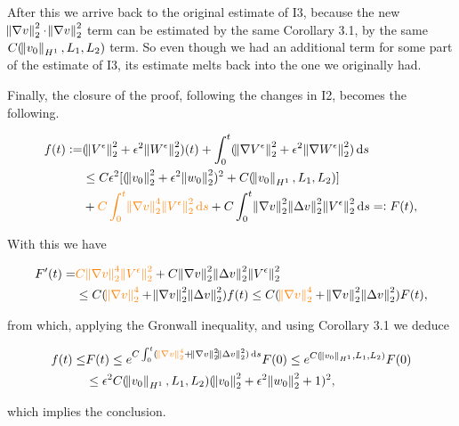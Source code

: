 \documentclass[11pt]{article}
\newcommand*\diff{\mathop{}\!\mathrm{d}}
\begin{document}
\begin{enumerate}
After this we arrive back to the original estimate of I3, because the new $\norm{\nabla v}_2^2 \cdot \norm{\nabla v}_2^2$ term can be estimated by the same Corollary 3.1, by the same $C(\norm{v_0}_{H^1}, L_1, L_2)$ term. So even though we had an additional term for some part of the estimate of I3, its estimate melts back into the one we originally had.

Finally, the closure of the proof, following the changes in I2, becomes the following.

\begin{equation}
  \begin{split} \nonumber
  f(t):= & (\norm{V^\epsilon}_2^2 + \epsilon^2 \norm{W^\epsilon}_2^2)(t) + \int_0^t (\norm{\nabla V^\epsilon}_2^2 + \epsilon^2 \norm{\nabla W^\epsilon}_2^2) \diff s \\
  & \leq C \epsilon^2 [(\norm{v_0}_2^2 + \epsilon^2 \norm{w_0}_2^2)^2 + C(\norm{v_0}_{H^1}, L_1, L_2)] \\
  & + \textcolor{orange}{C \int_0^{t} \norm{\nabla v}_2^4 \norm{V^\epsilon}_2^2 \diff s} + C \int_0^{t} \norm{\nabla v}_2^2  \norm{\Delta v}_2^2 \norm{V^\epsilon}_2^2 \diff s =: F(t),
  \end{split}
\end{equation}

With this we have

\begin{equation}
  \begin{split} \nonumber
   F'(t) = & \textcolor{orange}{C \norm{\nabla v}_2^4 \norm{V^\epsilon}_2^2} + C \norm{\nabla v}_2^2  \norm{\Delta v}_2^2 \norm{V^\epsilon}_2^2 \\
   & \leq C (\textcolor{orange}{\norm{\nabla v}_2^4} + \norm{\nabla v}_2^2  \norm{\Delta v}_2^2)f(t) \leq C (\textcolor{orange}{\norm{\nabla v}_2^4} + \norm{\nabla v}_2^2  \norm{\Delta v}_2^2)F(t),
  \end{split}
\end{equation}

from which, applying the Gronwall inequality, and using Corollary 3.1 we deduce

\begin{equation}
  \begin{split} \nonumber
    f(t) \leq & F(t) \leq e^{C \int_0 ^ t (\textcolor{orange}{\norm{\nabla v}_2^4} + \norm{\nabla v}_2^2  \norm{\Delta v}_2^2) \diff s} F(0) \leq e^{C(\norm{v_0}_{H^1}, L_1, L_2)} F(0)\\
    & \leq \epsilon^2 C(\norm{v_0}_{H^1}, L_1, L_2) (\norm{v_0}_2^2 + \epsilon^2 \norm{w_0}_2^2 + 1)^2,
  \end{split}
\end{equation}

which implies the conclusion.

\end{enumerate}
\end{document}
